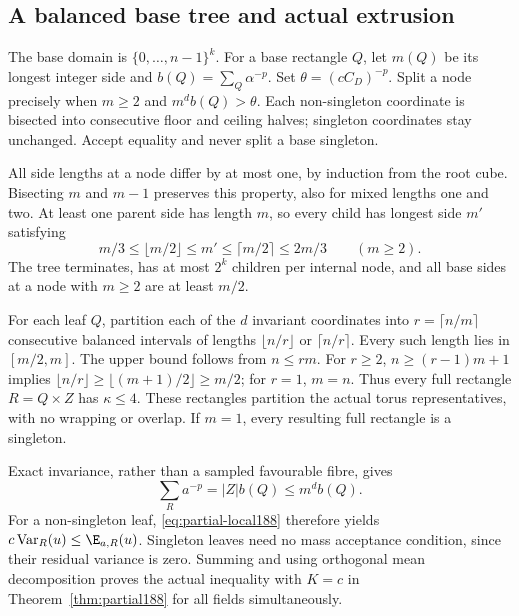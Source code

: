 \subsection{A balanced base tree and actual extrusion}
The base domain is $\{0,\ldots,n-1\}^k$. For a base rectangle $Q$, let
$m(Q)$ be its longest integer side and $b(Q)=\sum_Q\alpha^{-p}$.
Set $\theta=(cC_D)^{-p}$. Split a node precisely when
$m\ge2$ and $m^d b(Q)>\theta$. Each non-singleton coordinate is bisected
into consecutive floor and ceiling halves; singleton coordinates stay
unchanged. Accept equality and never split a base singleton.

All side lengths at a node differ by at most one, by induction from the
root cube. Bisecting $m$ and $m-1$ preserves this property, also for mixed
lengths one and two. At least one parent side has length $m$, so every
child has longest side $m'$ satisfying
\begin{equation}\label{eq:partial-child188}
 m/3\le\lfloor m/2\rfloor\le m'\le\lceil m/2\rceil\le2m/3
 \qquad(m\ge2).
\end{equation}
The tree terminates, has at most $2^k$ children per internal node, and
all base sides at a node with $m\ge2$ are at least $m/2$.

For each leaf $Q$, partition each of the $d$ invariant coordinates into
$r=\lceil n/m\rceil$ consecutive balanced intervals of lengths
$\lfloor n/r\rfloor$ or $\lceil n/r\rceil$. Every such length lies in
$[m/2,m]$. The upper bound follows from $n\le rm$. For $r\ge2$,
$n\ge(r-1)m+1$ implies
$\lfloor n/r\rfloor\ge\lfloor(m+1)/2\rfloor\ge m/2$; for $r=1$,
$m=n$. Thus every full rectangle $R=Q\times Z$ has $\kappa\le4$.
These rectangles partition the actual torus representatives, with no
wrapping or overlap. If $m=1$, every resulting full rectangle is a singleton.

Exact invariance, rather than a sampled favourable fibre, gives
\[
 \sum_Ra^{-p}=|Z|b(Q)\le m^d b(Q).
\]
For a non-singleton leaf, \eqref{eq:partial-local188} therefore yields
$c\operatorname{Var}_R(u)\le\E_{a,R}(u)$. Singleton leaves need no mass
acceptance condition, since their residual variance is zero. Summing and
using orthogonal mean decomposition proves the actual inequality with
$K=c$ in Theorem~\ref{thm:partial188} for all fields simultaneously.

